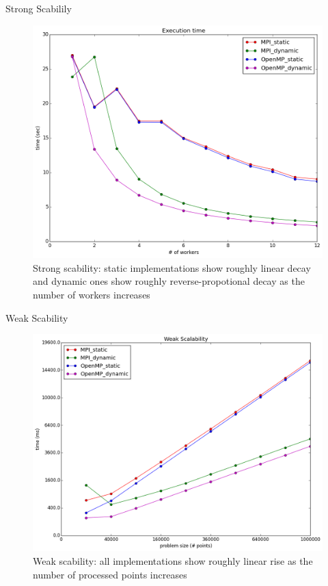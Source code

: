 \documentclass[12pt]{article}
\makeatletter
\renewenvironment{itemize}
{\list{$\bullet$}{\leftmargin\z@ \labelwidth\z@ \itemindent-\leftmargin
\let\makelabel\descriptionlabel}}
{\endlist}
\makeatother
\begin{document}
\begin{itemize}
    \item Strong Scabilily
    \begin{figure}
        \hspace{-1cm}
        \includegraphics[scale=.5]{./exec.png}
        \vspace{-3cm}
        \caption{Strong scability: static implementations show roughly linear decay and dynamic ones show roughly reverse-propotional decay as the number of workers increases}
        \vspace{2.5cm}
    \end{figure}
    \item Weak Scability
    \begin{figure}
        \hspace{-1cm}
        \includegraphics[scale=.5]{./problemsize.png}
        \vspace{-.5cm}
        \caption{Weak scability: all implementations show roughly linear rise as the number of processed points increases}
        \vspace{-1cm}
    \end{figure}


\end{itemize}
\end{document}
